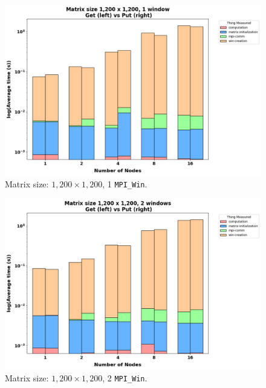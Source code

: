 \documentclass{article}
\begin{document}
    \begin{figure}
        \includegraphics[width=\textwidth]{./images/getvsput-1win-1200}
        \caption{Matrix size: $1,200 \times 1,200$, 1 \texttt{MPI\_Win}.}
        \label{fig:figure1}
    \end{figure}

    \begin{figure}
        \includegraphics[width=\textwidth]{./images/getvsput-2win-1200}
        \caption{Matrix size: $1,200 \times 1,200$, 2 \texttt{MPI\_Win}.}
        \label{fig:figure2}
    \end{figure}
\end{document}

